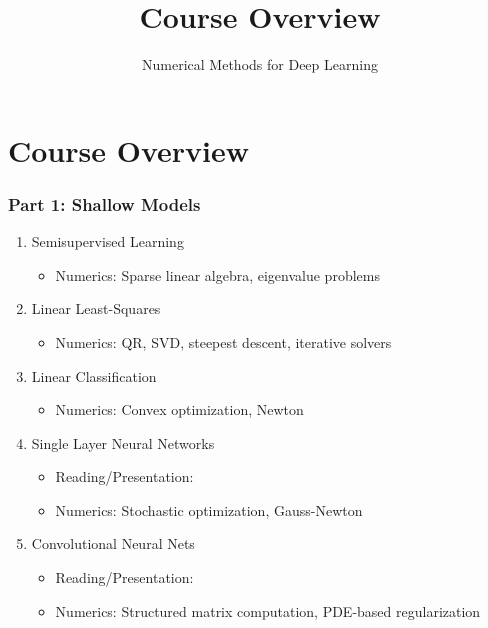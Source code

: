 \documentclass[12pt,fleqn]{beamer}
\title[Intro]{Course Overview}
\subtitle{Numerical Methods for Deep Learning}
\date{}
\begin{document}
\makebeamertitle
\section{Course Overview} 
\label{sec:course_overview}
\begin{frame}
\frametitle{Part 1: Shallow Models}
\begin{enumerate}
\item Semisupervised Learning
\begin{itemize}
	\item Numerics: Sparse linear algebra, eigenvalue problems
\end{itemize}
\item Linear Least-Squares
\begin{itemize}
	\item Numerics: QR, SVD, steepest descent, iterative solvers
\end{itemize}
\item Linear Classification
\begin{itemize}
	\item Numerics: Convex optimization, Newton 
\end{itemize}
\item Single Layer Neural Networks
\begin{itemize}
	\item Reading/Presentation: \cite{HuangEtAl2006} 
	\item Numerics: Stochastic optimization, Gauss-Newton
\end{itemize}
\item Convolutional Neural Nets
\begin{itemize}
	\item Reading/Presentation: \cite{LeCun1990,GlorotBengio2010} 
	\item Numerics: Structured matrix computation, PDE-based regularization
\end{itemize}
\end{enumerate}
\end{frame}
\end{document}
